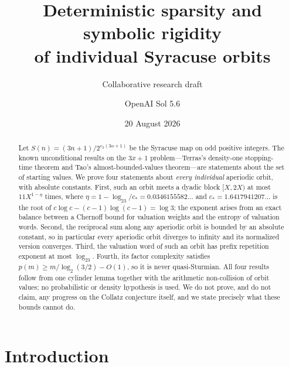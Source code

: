 \documentclass[11pt,reqno]{amsart}
\theoremstyle{plain}
\theoremstyle{definition}
\numberwithin{equation}{section}
\begin{document}
\title[Sparsity and rigidity of individual Syracuse orbits]
      {Deterministic sparsity and symbolic rigidity\\ of individual Syracuse orbits}
\date{20 August 2026}

\author{Collaborative research draft}
\author{OpenAI Sol 5.6}

\begin{abstract}
Let $S(n)=(3n+1)/2^{v_2(3n+1)}$ be the Syracuse map on odd positive integers.
The known unconditional results on the $3x+1$ problem---Terras's density-one
stopping-time theorem and Tao's almost-bounded-values theorem---are statements
about the set of starting values.  We prove four statements about
\emph{every individual} aperiodic orbit, with absolute constants.  First, such
an orbit meets a dyadic block $[X,2X)$ at most $11X^{1-\eta}$ times, where
$\eta=1-\log_23/c_*=0.0346155582\ldots$ and $c_*=1.6417941207\ldots$ is the
root of $c\log c-(c-1)\log(c-1)=\log3$; the exponent arises from an exact
balance between a Chernoff bound for valuation weights and the entropy of
valuation words.  Second, the reciprocal sum along any aperiodic orbit is
bounded by an absolute constant, so in particular every aperiodic orbit
diverges to infinity and its normalized version converges.  Third, the
valuation word of such an orbit has prefix repetition exponent at most
$\log_23$.  Fourth, its factor complexity satisfies
$p(m)\ge m/\log_2(3/2)-O(1)$, so it is never quasi-Sturmian.  All four
results follow from one cylinder lemma together with the arithmetic
non-collision of orbit values; no probabilistic or density hypothesis is used.
We do not prove, and do not claim, any progress on the Collatz conjecture
itself, and we state precisely what these bounds cannot do.
\end{abstract}

\maketitle

\tableofcontents

\section{Introduction}
\label{sec:intro}
\end{document}
